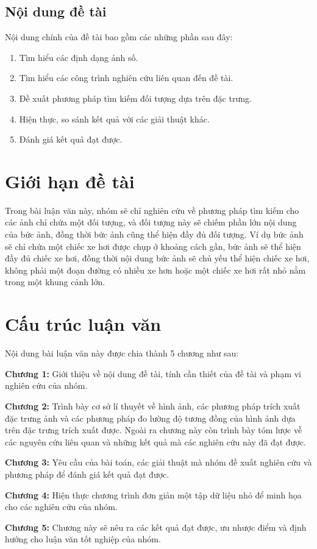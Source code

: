 \documentclass[a4paper,14pt]{extreport}
\begin{document}
\subsection{Nội dung đề tài}
Nội dung chính của đề tài bao gồm các những phần sau đây:
\begin{enumerate}
    \item Tìm hiểu các định dạng ảnh số.
    \item Tìm hiểu các công trình nghiên cứu liên quan đến đề tài.
    \item Đề xuất phương pháp tìm kiếm đối tượng dựa trên đặc trưng.
    \item Hiện thực, so sánh kết quả với các giải thuật khác.
    \item Đánh giá kết quả đạt được.
\end{enumerate}

\section{Giới hạn đề tài}
 Trong bài luận văn này, nhóm sẽ chỉ nghiên cứu về phương pháp tìm kiếm cho các ảnh chỉ chứa một đối tượng, và đối tượng này sẽ chiếm phần lớn nội dung của bức ảnh, 
đồng thời bức ảnh cũng thể hiện đầy đủ đối tượng. Ví dụ bức ảnh sẽ chỉ chứa một chiếc xe hơi được chụp ở khoảng cách gần, bức ảnh sẽ thể hiện đầy đủ chiếc xe hơi, 
đồng thời nội dung bức ảnh sẽ chủ yếu thể hiện chiếc xe hơi, không phải một đoạn đường có nhiều xe hơn hoặc một chiếc xe hơi rất nhỏ nằm trong một khung cảnh lớn.

\section{Cấu trúc luận văn}
Nội dung bài luận văn này được chia thành 5 chương như sau:
\par
\textbf{Chương 1:} Giới thiệu về nội dung đề tài, tính cần thiết của đề tài và phạm vi nghiên cứu của nhóm.
\par
\textbf{Chương 2:} Trình bày cơ sở lí thuyết về hình ảnh, các phương pháp trích xuất đặc trưng ảnh và các phương pháp đo lường độ tương đồng của hình ảnh dựa trên đặc trưng trích xuất được. Ngoài ra chương này còn trình bày tóm lược về các nguyên cứu liên quan và những kết quả  mà các nghiên cứu này đã đạt được.
\par
\textbf{Chương 3:} Yêu cầu của bài toán, các giải thuật mà nhóm đề xuất nghiên cứu và phương pháp để đánh giá kết quả đạt được.
\par
\textbf{Chương 4:} Hiện thực chương trình đơn giản một tập dữ liệu nhỏ để minh họa cho các nghiên cứu của nhóm. 
\par
\textbf{Chương 5:} Chương này sẽ nêu ra các kết quả đạt được, ưu nhược điểm và định hướng cho luận văn tốt nghiệp của nhóm.
\end{document}
